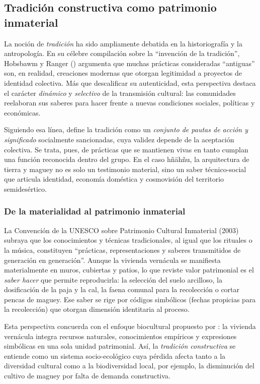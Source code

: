 \subsection{Tradición constructiva como patrimonio inmaterial}
\label{subsec:tradicion_constructiva}

La noción de \emph{tradición} ha sido ampliamente debatida en la
historiografía y la antropología.  En su célebre compilación sobre la
``invención de la tradición'', Hobsbawm y Ranger (\citeyear{hobsbawm1983inventar})
argumenta que muchas prácticas consideradas “antiguas” son, en realidad,
creaciones modernas que otorgan legitimidad a proyectos de identidad
colectiva.  Más que descalificar su autenticidad, esta perspectiva
destaca el carácter \emph{dinámico} y \emph{selectivo} de la
transmisión cultural: las comunidades reelaboran sus saberes para hacer
frente a nuevas condiciones sociales, políticas y económicas.

Siguiendo esa línea, \citeauthor{herrejon1994} define la tradición como
un \emph{conjunto de pautas de acción y significado}
socialmente sancionadas, cuya validez depende de la aceptación
colectiva.\citep{herrejon1994}  Se trata, pues, de prácticas que se
mantienen vivas en tanto cumplan una función reconocida dentro del
grupo.  En el caso hñähñu, la arquitectura de tierra y maguey no es
solo un testimonio material, sino un saber técnico-social que articula
identidad, economía doméstica y cosmovisión del territorio
semidesértico.

\subsubsection{De la materialidad al patrimonio inmaterial}

La Convención de la UNESCO sobre Patrimonio Cultural Inmaterial (2003)
subraya que los conocimientos y técnicas
tradicionales, al igual que los rituales o la música, constituyen
``prácticas, representaciones y saberes transmitidos de
generación en generación''.  Aunque la vivienda vernácula se manifiesta
materialmente en muros, cubiertas y patios, lo que reviste valor
patrimonial es el \emph{saber hacer} que permite reproducirla: la
selección del suelo arcilloso, la dosificación de la paja y la cal, la
faena comunal para la recolección o cortar pencas de maguey. Ese saber
se rige por códigos simbólicos (fechas propicias
para la recolección) que otorgan dimensión identitaria al proceso.

Esta perspectiva concuerda con el enfoque biocultural propuesto por
\cite{chang2010patrimonio}: la vivienda
vernácula integra recursos naturales, conocimientos empíricos y
expresiones simbólicas en una sola unidad patrimonial.  Así, la
\emph{tradición constructiva} se entiende como un sistema
socio-ecológico cuya pérdida afecta tanto a la diversidad cultural como
a la biodiversidad local, por ejemplo, la disminución del cultivo de
maguey por falta de demanda constructiva.


